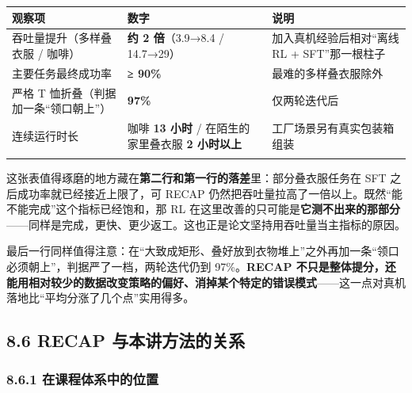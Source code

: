 \documentclass[
  chinese,
]{ctexart}
\begin{document}
\begin{center}
\begin{tabular}{@{}>{\raggedright\arraybackslash}p{} >{\raggedright\arraybackslash}p{} >{\raggedright\arraybackslash}p{}@{}}
\toprule\noalign{}
观察项 & 数字 & 说明 \\
\midrule\noalign{}
吞吐量提升（多样叠衣服 / 咖啡） & \textbf{约 2 倍}（3.9→8.4 / 14.7→29） & 加入真机经验后相对``离线 RL + SFT''那一根柱子 \\
主要任务最终成功率 & \textbf{≥ 90\%} & 最难的多样叠衣服除外 \\
严格 T 恤折叠（判据加一条``领口朝上''） & \textbf{97\%} & 仅两轮迭代后 \\
连续运行时长 & 咖啡 \textbf{13 小时} / 在陌生的家里叠衣服 \textbf{2 小时以上} & 工厂场景另有真实包装箱组装 \\
\bottomrule\noalign{}
\end{tabular}
\end{center}

这张表值得琢磨的地方藏在\textbf{第二行和第一行的落差}里：部分叠衣服任务在
SFT 之后成功率就已经接近上限了，可 RECAP
仍然把吞吐量拉高了一倍以上。既然``能不能完成''这个指标已经饱和，那 RL
在这里改善的只可能是\textbf{它测不出来的那部分}------同样是完成，更快、更少返工。这也正是论文坚持用吞吐量当主指标的原因。

最后一行同样值得注意：在``大致成矩形、叠好放到衣物堆上''之外再加一条``领口必须朝上''，判据严了一档，两轮迭代仍到
97\%。\textbf{RECAP
不只是整体提分，还能用相对较少的数据改变策略的偏好、消掉某个特定的错误模式}------这一点对真机落地比``平均分涨了几个点''实用得多。

\subsection{8.6 RECAP
与本讲方法的关系}\label{recap-ux4e0eux672cux8bb2ux65b9ux6cd5ux7684ux5173ux7cfb}

\subsubsection{8.6.1
在课程体系中的位置}\label{ux5728ux8bfeux7a0bux4f53ux7cfbux4e2dux7684ux4f4dux7f6e}
\end{document}
